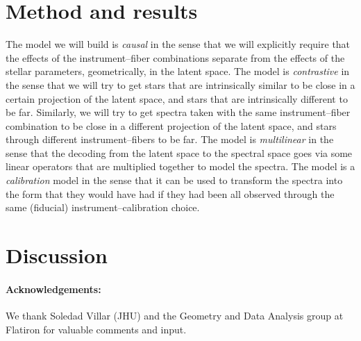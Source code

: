 \documentclass{article}
\begin{document}
\section{Method and results}
The model we will build is \emph{causal} in the sense that we will explicitly require that the effects of the instrument--fiber combinations separate from the effects of the stellar parameters, geometrically, in the latent space.
The model is \emph{contrastive} in the sense that we will try to get stars that are intrinsically similar to be close in a certain projection of the latent space, and stars that are intrinsically different to be far.
Similarly, we will try to get spectra taken with the same instrument--fiber combination to be close in a different projection of the latent space, and stars through different instrument--fibers to be far.
The model is \emph{multilinear} in the sense that the decoding from the latent space to the spectral space goes via some linear operators that are multiplied together to model the spectra.
The model is a \emph{calibration} model in the sense that it can be used to transform the spectra into the form that they would have had if they had been all observed through the same (fiducial) instrument--calibration choice.

\section{Discussion}

\paragraph{Acknowledgements:}
We thank
 Soledad Villar (JHU)
and the Geometry and Data Analysis group at Flatiron for valuable comments and input.
\end{document}
